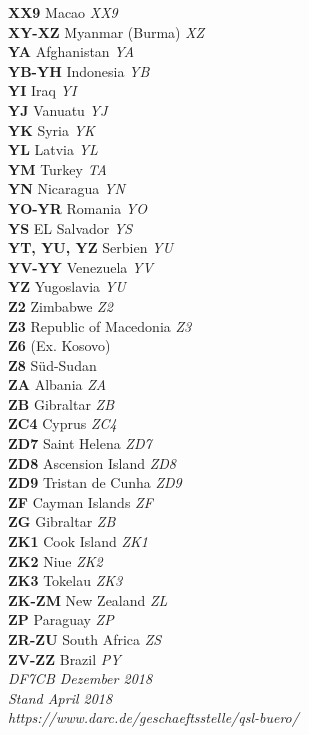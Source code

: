 \documentclass[landscape,a4paper]{article}
\begin{document}
\begin{multicols}{7}
\textbf{XX9} Macao \emph{XX9} \\
\textbf{XY-XZ} Myanmar (Burma) \emph{XZ} \\
\textbf{YA} Afghanistan \emph{YA} \\
\textbf{YB-YH} Indonesia \emph{YB} \\
\textbf{YI} Iraq \emph{YI} \\
\textbf{YJ} Vanuatu \emph{YJ} \\
\textbf{YK} Syria \emph{YK} \\
\textbf{YL} Latvia \emph{YL} \\
\textbf{YM} Turkey \emph{TA} \\
\textbf{YN} Nicaragua \emph{YN} \\
\textbf{YO-YR} Romania \emph{YO} \\
\textbf{YS} EL Salvador \emph{YS} \\
\textbf{YT, YU, YZ} Serbien \emph{YU} \\
\textbf{YV-YY} Venezuela \emph{YV} \\
\textbf{YZ} Yugoslavia \emph{YU} \\
\textbf{Z2} Zimbabwe \emph{Z2} \\
\textbf{Z3} Republic of Macedonia \emph{Z3} \\
\textbf{Z6} (Ex. Kosovo) \\
\textbf{Z8} Süd-Sudan \\
\textbf{ZA} Albania \emph{ZA} \\
\textbf{ZB} Gibraltar \emph{ZB} \\
\textbf{ZC4} Cyprus \emph{ZC4} \\
\textbf{ZD7} Saint Helena \emph{ZD7} \\
\textbf{ZD8} Ascension Island \emph{ZD8} \\
\textbf{ZD9} Tristan de Cunha \emph{ZD9} \\
\textbf{ZF} Cayman Islands \emph{ZF} \\
\textbf{ZG} Gibraltar \emph{ZB} \\
\textbf{ZK1} Cook Island \emph{ZK1} \\
\textbf{ZK2} Niue \emph{ZK2} \\
\textbf{ZK3} Tokelau \emph{ZK3} \\
\textbf{ZK-ZM} New Zealand \emph{ZL} \\
\textbf{ZP} Paraguay \emph{ZP} \\
\textbf{ZR-ZU} South Africa \emph{ZS} \\
\textbf{ZV-ZZ} Brazil \emph{PY} \\

\noindent
\tiny
\emph{DF7CB Dezember 2018 \\
Stand April 2018 \\
https://www.darc.de/geschaeftsstelle/qsl-buero/}
\end{multicols}
\end{document}
